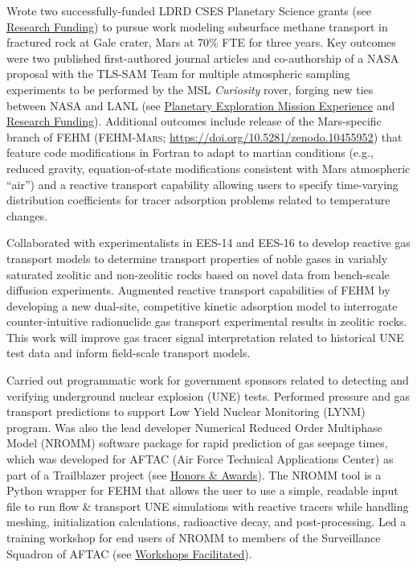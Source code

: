 \documentclass[11pt, letterpaper]{article}
\begin{document}
    Wrote two successfully-funded LDRD CSES Planetary Science grants (see
    \hyperref[sec:funding]{Research Funding}) to pursue work modeling
    subsurface methane transport in fractured rock at Gale crater, Mars at 70\%
    FTE for three years. Key outcomes were two published first-authored journal
    articles and co-authorship of a NASA proposal with the TLS-SAM Team for
    multiple atmospheric sampling experiments to be performed by the MSL
    \textit{Curiosity} rover, forging new ties between NASA and LANL (see
    \hyperref[sec:missions]{Planetary Exploration Mission Experience} and
    \hyperref[sec:funding]{Research Funding}). Additional outcomes include release
    of the Mars-specific branch of FEHM (\textsc{FEHM-Mars};
    \href{https://doi.org/10.5281/zenodo.10455952}{https://doi.org/10.5281/zenodo.10455952})
    that feature code modifications in Fortran to adapt to martian conditions (e.g., reduced
        gravity, equation-of-state modifications consistent with Mars atmospheric
    ``air'') and a reactive transport capability allowing users to specify
    time-varying distribution coefficients for tracer adsorption problems related
    to temperature changes.

    Collaborated with experimentalists in EES-14 and EES-16 to develop reactive
    gas transport models to determine transport properties of noble gases in
    variably saturated zeolitic and non-zeolitic rocks based on novel data from
    bench-scale diffusion experiments. Augmented reactive transport
    capabilities of FEHM by developing a new dual-site, competitive kinetic
    adsorption model to interrogate counter-intuitive radionuclide gas
    transport experimental results in zeolitic rocks. This work will improve
    gas tracer signal interpretation related to historical UNE test data and
    inform field-scale transport models.

    Carried out programmatic work for government sponsors related to detecting
    and verifying underground nuclear explosion (UNE) tests. Performed pressure
    and gas transport predictions to support Low Yield Nuclear Monitoring
    (LYNM) program.  Was also the lead developer Numerical Reduced Order
    Multiphase Model (NROMM) software package for rapid prediction of gas
    seepage times, which was developed for AFTAC (Air Force Technical
    Applications Center) as part of a Trailblazer project (see
    \hyperref[sec:awards]{Honors \& Awards}). The NROMM tool is a Python
    wrapper for FEHM that allows the user to use a simple, readable input file
    to run flow \& transport UNE simulations with reactive tracers while
    handling meshing, initialization calculations, radioactive decay, and
    post-processing. Led a training workshop for end users of NROMM to members of
    the  Surveillance Squadron of AFTAC  (see
    \hyperref[sec:workshopsFacilitated]{Workshops Facilitated}). 
\end{document}
